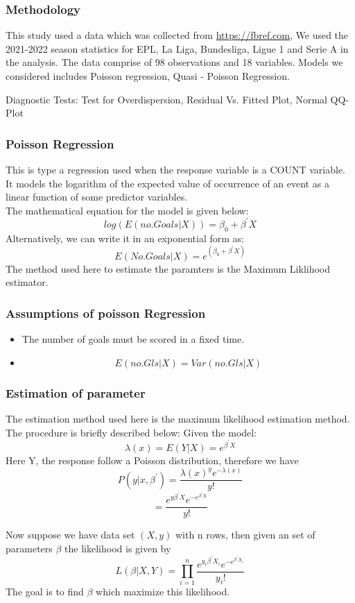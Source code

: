 \documentclass[11pt]{beamer}
\begin{document}
	\begin{frame}
		\frametitle{Methodology}
		This study used  a data which was collected from \url{ https://fbref.com}, 
		We used the
		2021-2022 season statistics for EPL, La Liga, Bundesliga, Ligue 1 and Serie A in the analysis. The data comprise of 98 observations and 18 variables.
		Models we considered includes
		Poisson regression,
		 Quasi - Poisson Regression.
		 
		Diagnostic Tests: Test for Overdispersion, Residual Vs. Fitted Plot, Normal QQ-Plot
	\end{frame}

\begin{frame}
	\frametitle{Poisson Regression}
	This is type a regression used when the response variable is a COUNT variable. It models the logarithm of the expected value of occurrence of an event as a linear function of some predictor variables.\\
	The mathematical equation for the model is given below:
	\[log(E(no.Goals|X))= \beta_0+\beta^{'}X\]
	Alternatively, we can write it in an exponential form as:
	\[E(No.Goals|X)= e^{(\beta_0+\beta^{'}X)}\]
	The method used here to estimate the paramters is the Maximum Liklihood estimator.	
	
\end{frame}

\begin{frame}
	\frametitle{Assumptions of poisson Regression}
	\begin{itemize}
		\item The number of goals must be scored in a fixed time.
		\item \[E(no.Gls|X) =Var(no.Gls|X)\]
	\end{itemize}
\end{frame}
\begin{frame}
	\frametitle{Estimation of parameter}
	The estimation method used here is the maximum likelihood estimation method.
	The procedure is briefly described below:
	Given the model:
	\[\lambda(x)= E(Y|X)= e^{\beta^{'}X}\]
	Here Y, the response follow a Poisson distribution, therefore we have
	\[P(y|x,\beta^{'})= \frac{\lambda(x)^y e^{-\lambda(x)}}{y!}\]   \[= \frac{e^{y \beta^{'}X} e^{-e^{\beta^{'}X}}}{y!}\]
	
	Now suppose we have  data set $(X,y)$ with n rows, then given an set of parameters $\beta$ the likelihood is given by
	\[L(\beta|X,Y)= \prod_{i=1}^{n} \frac{e^{y_i \beta^{'}X_i} e^{-e^{\beta^{'}X_i}}}{y_i!}\]
	The goal is to find $\beta$ which maximize this likelihood.
\end{frame}
\end{document}
